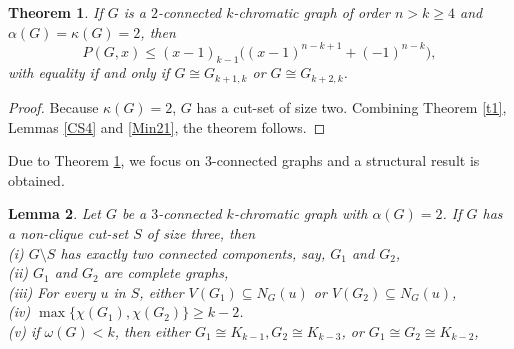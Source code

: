 \documentclass[12pt]{article}
\newtheorem{theorem}{Theorem}[section]
\newtheorem{lemma}[theorem]{Lemma}
\theoremstyle{definition}
\begin{document}
\begin{theorem}\label{t2} If $G$ is a $2$-connected $k$-chromatic graph of order $n>k\geq 4$ and $\alpha(G)=\kappa(G)=2$, then $$P(G,x)\leq (x-1)_{k-1}\big((x-1)^{n-k+1}+(-1)^{n-k}\big),$$ with equality if and only if $G\cong G_{k+1,k}$ or $G\cong G_{k+2,k}$.
\end{theorem}

\begin{proof} Because $\kappa(G)=2$, $G$ has a cut-set of size two. Combining Theorem \ref{t1}, Lemmas \ref{CS4} and \ref{Min21}, the theorem follows.
\end{proof}



Due to Theorem \ref{t2}, we focus on $3$-connected graphs and a structural result is obtained.

\begin{lemma}\label{CS3} Let $G$  be a $3$-connected $k$-chromatic graph with $\alpha(G)=2$. If $G$ has a non-clique cut-set $S$ of size three, then
\\(i) $G\setminus S$ has exactly two connected components, say, $G_1$ and $G_2$,
\\(ii) $G_1$ and $G_2$ are complete graphs,
\\(iii) For every $u$ in $S$, either $V(G_1)\subseteq N_G(u)$ or $V(G_2)\subseteq N_G(u)$,
\\(iv) $\max\{\chi(G_1), \chi(G_2)\}\geq k-2$.
\\(v) if $\omega(G)< k$, then either $G_1\cong K_{k-1}, G_2\cong K_{k-3}$, or $G_1\cong G_2\cong K_{k-2}$,
\end{lemma}
\end{document}
